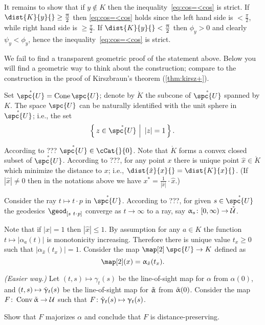 It remains to show that if $y\notin K$ 
then the inequality~\ref{eq:cos=<cos}
is strict.
If $\dist{K}{y}{}\ge\tfrac\pi2$ then \ref{eq:cos=<cos} holds since 
the left hand side is $<\tfrac\pi2$,
while right hand side is $\ge \tfrac\pi2$.
If $\dist{K}{y}{}<\tfrac\pi2$ then $\phi_y>0$ and clearly $\psi_y<\phi_y$,
hence the inequality~\ref{eq:cos=<cos} is strict.
\qeds

We fail to find a transparent geometric proof of the statement above.
Below you will find a geometric way to think about the construction; 
compare to the construction 
in the proof of Kirszbraun's theorem (\ref{thm:kirsz+}).

Set $\mathring{\spc{U}}=\Cone \spc{U}$;
denote by $\mathring{K}$ the subcone of $\mathring{\spc{U}}$ spanned by $K$.
The space $\spc{U}$ can be naturally identified with the unit sphere in $\mathring{\spc{U}}$;
i.e., the set 
\[\set{z\in \mathring{\spc{U}}}{|z|=1}.\]

According to ??? $\mathring{\spc{U}}\in\cCat{}{0}$.
Note that $\mathring{K}$ forms a convex closed subset of $\mathring{\spc{U}}$.
According to ???, for any point $x$ there is unique point $\hat x\in \mathring{K}$
which minimize the distance to $x$;
i.e., $\dist{\hat x}{x}{}=\dist{K}{x}{}$.
(If $|\hat x|\ne0$ then in the notations above we have
$x^*=\tfrac1{|\hat x|}\cdot\hat x$.)

Consider the ray $t\mapsto t\cdot p$ in  $\mathring{\spc{U}}$.
According to ???, %
for given $s\in \mathring{\spc{U}}$
the geodesics $\geod_{[s\ t\cdot p]}$ converge as $t\to\infty$ to a ray, 
say $\alpha_s\:[0,\infty)\to \mathring{\spc{U}}$.



Note that if $|x|=1$ then $|\hat x|\le 1$.
By assumption for any $a\in K$ the function $t\mapsto |\alpha_a(t)|$ is monotonicity increasing.
Therefore there is unique value $t_x\ge 0$ such that
$|\alpha_{\hat x}(t_x)|=1$.
Consider the map $\map[2]\:\spc{U}\to K$
defined as 
\[\map[2](x)=\alpha_{\hat x}(t_x).\]


\textit{(Easier way.)} 
Let 
$(t,s)\mapsto \gamma_t(s)$ be the line-of-sight map 
for $\alpha$ from $\alpha(0)$,
and 
$(t,s)\mapsto \~\gamma_t(s)$ be the line-of-sight map 
for $\~\alpha$ from $\~\alpha(0)$.
Consider the map  $F\:\Conv\~\alpha\to \spc{U}$ such that 
$F\:\~\gamma_t(s)\mapsto \gamma_t(s)$.

Show that $F$ majorizes $\alpha$
and conclude that $F$ is distance-preserving.

